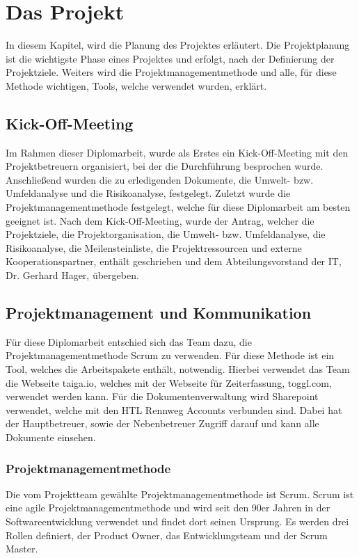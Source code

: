 \chapter{Das Projekt}

In diesem Kapitel, wird die Planung des Projektes erläutert. Die Projektplanung ist die wichtigste Phase eines Projektes und erfolgt, nach der Definierung der Projektziele.   Weiters wird die Projektmanagementmethode und alle, für diese Methode wichtigen, Tools, welche verwendet wurden, erklärt.

\section{Kick-Off-Meeting}

Im Rahmen dieser Diplomarbeit, wurde als Erstes ein Kick-Off-Meeting mit den Projektbetreuern organisiert, bei der die Durchführung besprochen wurde. Anschließend wurden die zu erledigenden Dokumente, die Umwelt- bzw. Umfeldanalyse und die Risikoanalyse, festgelegt. Zuletzt wurde die Projektmanagementmethode festgelegt, welche für diese Diplomarbeit am besten geeignet ist. Nach dem Kick-Off-Meeting, wurde der Antrag, welcher die Projektziele, die Projektorganisation, die Umwelt- bzw. Umfeldanalyse, die Risikoanalyse, die Meilensteinliste, die Projektressourcen und externe Kooperationspartner, enthält geschrieben und dem Abteilungsvorstand der IT, Dr. Gerhard Hager, übergeben.

\section{Projektmanagement und Kommunikation}

Für diese Diplomarbeit entschied sich das Team dazu, die Projektmanagementmethode Scrum zu verwenden. Für diese Methode ist ein Tool, welches die Arbeitspakete enthält, notwendig. Hierbei verwendet das Team die Webseite taiga.io, welches mit der Webseite für Zeiterfassung, toggl.com, verwendet werden kann. Für die Dokumentenverwaltung wird Sharepoint verwendet, welche mit den HTL Rennweg Accounts verbunden sind. Dabei hat der Hauptbetreuer, sowie der Nebenbetreuer Zugriff darauf und kann alle Dokumente einsehen.

\subsection{Projektmanagementmethode} 

Die vom Projektteam gewählte Projektmanagementmethode ist Scrum. Scrum ist eine agile Projektmanagementmethode und wird seit den 90er Jahren in der Softwareentwicklung verwendet und findet dort seinen Ursprung. Es werden drei Rollen definiert, der Product Owner, das Entwicklungsteam und der Scrum Master. 

